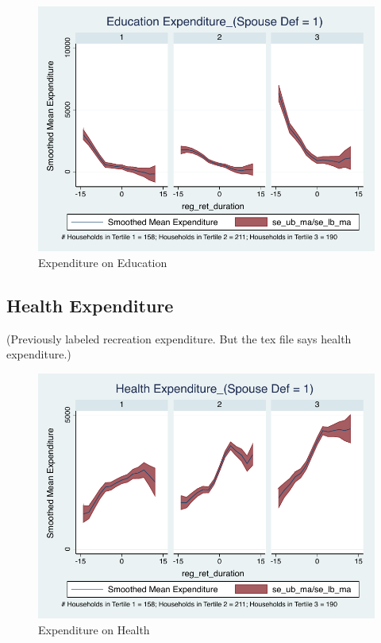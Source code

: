 \documentclass[a4paper]{article}
\begin{document}
\begin{figure}[h]
	\caption{Expenditure on Education}
	\centering
	\includegraphics[width=1.0\textwidth]{../ConsumptionPostRetirement_by_SpouseDef_Cats/Smoothed/1/spouse_def_total_education_real.pdf}
\end{figure}
\clearpage

\subsection{Health Expenditure}
(Previously labeled recreation expenditure. But the tex file says health expenditure.)

\begin{table}[h]
	\centering
	
\end{table}

\begin{figure}[h]
	\caption{Expenditure on Health}
	\centering
	\includegraphics[width=1.0\textwidth]{../ConsumptionPostRetirement_by_SpouseDef_Cats/Smoothed/1/spouse_def_total_healthexpense_real.pdf}
\end{figure}
\clearpage
\end{document}
